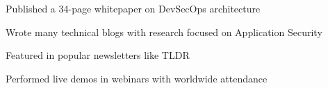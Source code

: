 \item Published a 34-page whitepaper on DevSecOps architecture
\item Wrote many technical blogs with research focused on Application Security
\item Featured in popular newsletters like TLDR
\item Performed live demos in webinars with worldwide attendance